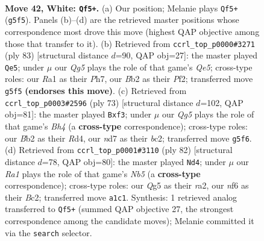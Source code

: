 \documentclass[11pt]{article}
\begin{document}
\clearpage

\begin{figure}[p]\centering
\begin{subfigure}{0.46\textwidth}\centering
\resizebox{\linewidth}{!}{%
\newchessgame
\chessboard[
  setfen={3q4/1b1n1p1k/3P1n2/2p3Qp/p6P/5pP1/PB6/R5K1 w - - 4 42},
  showmover=false,
  pgfstyle=straightmove, color=movearrow, markmove={g5-f5}
]}
\caption{}
\end{subfigure}\hfill
\begin{subfigure}{0.46\textwidth}\centering
\resizebox{\linewidth}{!}{%
\newchessgame
\chessboard[
  setfen={6k1/p6p/2p3p1/P7/4q2P/1PP1N1P1/3K1p2/3B1N2 b - - 5 42},
  showmover=false,
  pgfstyle=straightmove, color=movearrow, markmove={e4-e5}
]}
\caption{}
\end{subfigure}
\\[4pt]
\begin{subfigure}{0.46\textwidth}\centering
\resizebox{\linewidth}{!}{%
\newchessgame
\chessboard[
  setfen={5r1k/pQ4p1/7p/4NP1b/3r1q2/P4N1P/1PB5/4BK2 b - - 1 37},
  showmover=false,
  pgfstyle=straightmove, color=movearrow, markmove={h5-f3}
]}
\caption{}
\end{subfigure}\hfill
\begin{subfigure}{0.46\textwidth}\centering
\resizebox{\linewidth}{!}{%
\newchessgame
\chessboard[
  setfen={6k1/3nqp2/5np1/1N1P2Q1/1Pp5/2P4P/r1B2RK1/8 w - - 5 42},
  showmover=false,
  pgfstyle=straightmove, color=movearrow, markmove={b5-d4}
]}
\caption{}
\end{subfigure}
\caption{\textbf{Move 42, White: \texttt{Qf5+}.} (a) Our position; Melanie plays \texttt{Qf5+} (\texttt{g5f5}). Panels (b)--(d) are the retrieved master positions whose correspondence most drove this move (highest QAP objective among those that transfer to it). (b) Retrieved from \texttt{ccrl\_top\_p0000\#3271} (ply 83) [structural distance $d$=90, QAP obj=27]: the master played \texttt{Qe5}; under $\mu$ our \emph{Qg5} plays the role of that game's \emph{Qe5}; cross-type roles: our \emph{R}a1 as their \emph{P}h7, our \emph{B}b2 as their \emph{P}f2; transferred move \texttt{g5f5} \textbf{(endorses this move)}. (c) Retrieved from \texttt{ccrl\_top\_p0003\#2596} (ply 73) [structural distance $d$=102, QAP obj=81]: the master played \texttt{Bxf3}; under $\mu$ our \emph{Qg5} plays the role of that game's \emph{Bh4} (a \textbf{cross-type} correspondence); cross-type roles: our \emph{B}b2 as their \emph{R}d4, our \emph{n}d7 as their \emph{b}c2; transferred move \texttt{g5f6}. (d) Retrieved from \texttt{ccrl\_top\_p0001\#3110} (ply 82) [structural distance $d$=78, QAP obj=80]: the master played \texttt{Nd4}; under $\mu$ our \emph{Ra1} plays the role of that game's \emph{Nb5} (a \textbf{cross-type} correspondence); cross-type roles: our \emph{Q}g5 as their \emph{r}a2, our \emph{n}f6 as their \emph{B}c2; transferred move \texttt{a1c1}. Synthesis: 1 retrieved analog transferred to \texttt{Qf5+} (summed QAP objective 27, the strongest correspondence among the candidate moves); Melanie committed it via the \texttt{search} selector.}
\label{fig:thought-m82}
\end{figure}
\end{document}
